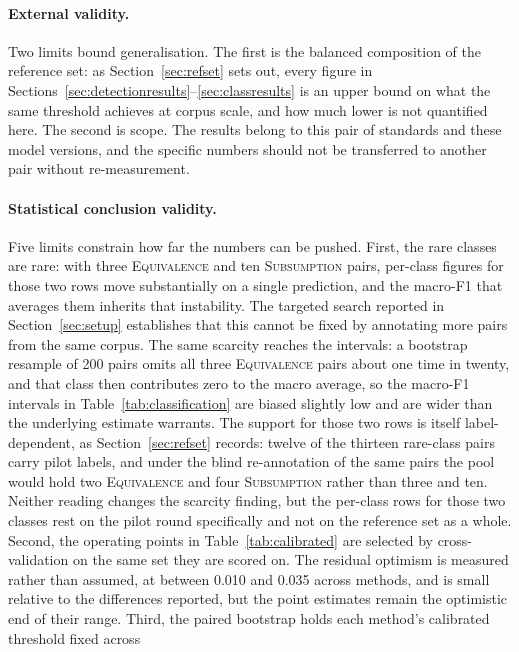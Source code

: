 \paragraph{External validity.} Two limits bound generalisation. The first is the
balanced composition of the reference set: as Section~\ref{sec:refset} sets out,
every figure in Sections~\ref{sec:detectionresults}--\ref{sec:classresults} is an
upper bound on what the same threshold achieves at corpus scale, and how much
lower is not quantified here. The second is scope. The results belong to this
pair of standards and these model versions, and the specific numbers should not
be transferred to another pair without re-measurement.

\paragraph{Statistical conclusion validity.} Five limits constrain how far the
numbers can be pushed. First, the rare classes are rare: with three
\textsc{Equivalence} and ten \textsc{Subsumption} pairs, per-class figures for
those two rows move substantially on a single prediction, and the macro-F1 that
averages them inherits that instability. The targeted search reported in
Section~\ref{sec:setup} establishes that this cannot be fixed by annotating more
pairs from the same corpus. The same scarcity reaches the intervals: a bootstrap
resample of 200 pairs omits all three \textsc{Equivalence} pairs about one time
in twenty, and that class then contributes zero to the macro average, so the
macro-F1 intervals in Table~\ref{tab:classification} are biased slightly low and
are wider than the underlying estimate warrants. The support for those two rows is
itself label-dependent, as Section~\ref{sec:refset} records: twelve of the thirteen
rare-class pairs carry pilot labels, and under the blind re-annotation of the same
pairs the pool would hold two \textsc{Equivalence} and four \textsc{Subsumption}
rather than three and ten. Neither reading changes the scarcity finding, but the
per-class rows for those two classes rest on the pilot round specifically and not
on the reference set as a whole. Second, the operating points in
Table~\ref{tab:calibrated} are selected by cross-validation on the same set they
are scored on. The residual optimism is measured rather than assumed, at between
0.010 and 0.035 across methods, and is small relative to the differences
reported, but the point estimates remain the optimistic end of their range.
Third, the paired bootstrap holds each method's calibrated threshold fixed across
